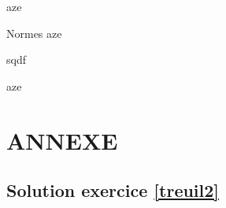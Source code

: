 \documentclass[
	11pt, %
	fleqn, %
	a4paper, %
]{LegrandOrangeBook}
\begin{document}
\begin{corollary}[S2.4] 
aze
\end{corollary}

\begin{definition}{Normes}
aze
\end{definition}

\begin{theorem}
    sqdf
\end{theorem}

\begin{remark}
    aze
\end{remark}







\chapterspaceabove{6.25cm} %
\chapterspacebelow{7.5cm} %



	




\newpage
\section{ANNEXE}

\subsection*{Solution exercice \ref{treuil2} }
\begin{figure}[H]  %
	\centering %
\end{figure}


{} %
\printindex %
\end{document}
